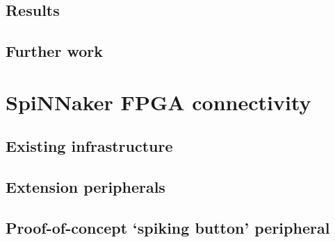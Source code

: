 		
		\subsection{Results}
			
		
		\subsection{Further work}
			
	
	
	\section{SpiNNaker FPGA connectivity}
		
			
			\subsection{Existing infrastructure}
				
			
			\subsection{Extension peripherals}
				
			
			\subsection{Proof-of-concept `spiking button' peripheral}
				
